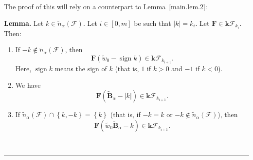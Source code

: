 \documentclass[12pt]{article}
\theoremstyle{definition}%
\newtheorem{lem}[thm]{Lemma}
\theoremstyle{definition}%
\theoremstyle{remark}%
\newcommand{\tup}[1]{\left( #1 \right)}
\newcommand{\interval}[1]{\left[ #1 \right]} %
\newcommand{\set}[1]{\left\{ #1 \right\}}
\newcommand{\abs}[1]{\left| #1 \right|} %
\newcommand{\kk}{\mathbf{k}}
\newcommand{\kf}{\kk\mathcal{F}}
\newcommand{\BBta}{\widetilde{\mathbf{B}}_{\alpha}}
\newcommand{\FF}{\mathbf{F}}
\newcommand{\CF}{\mathcal{F}}
\newcommand{\wotil}{\widetilde{w}_0}
\newcommand{\nna}{\widetilde{n}_{ \alpha } }%
\newcommand{\sign}{\operatorname{sign}}
\newenvironment{lem}[1][Lemma]{\noindent\textbf{#1.} }{\ \rule{0.5em}{0.5em}}
\begin{document}
The proof of this will rely on a counterpart to Lemma~\ref{main.lem.2}:

\begin{lem}
\label{main.lem.3}
Let $k \in \nna\tup{\CF}$.
Let $i\in \interval{0, m}$ be such that $\abs{k} = k_i$.
Let $\FF\in\kf_{k_i}$. Then:

\begin{enumerate}
\item[\textbf{(a)}] If $-k \notin \nna\tup{\CF}$,
then
\[
\FF \tup{ \wotil - \sign k }
\in\kf_{k_{i+1}}.
\]
Here, $\sign k$ means the sign of $k$ (that is, $1$ if $k>0$ and
$-1$ if $k<0$).

\item[\textbf{(b)}] We have
\[
\FF \tup{ \BBta - \abs{k} }
\in\kf_{k_{i+1}}.
\]

\item[\textbf{(c)}] If
$\nna \tup{\CF} \cap \set{k,-k} = \set{k}$
(that is, if $-k = k$ or $-k \notin \nna\tup{\CF}$),
then
\[
\FF \tup{\wotil\BBta - k}
\in\kf_{k_{i+1}}.
\]

\end{enumerate}
\end{lem}
\end{document}
